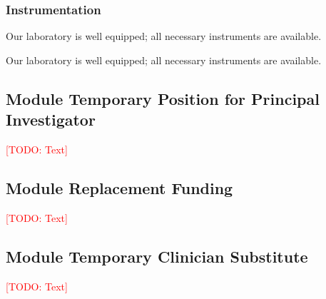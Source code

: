 \documentclass[american,firsttime]{dfgproposal}
\newcommand{\todo}[1]{\xspace{\textcolor{red}{[TODO: #1]}}\xspace}
\begin{document}
	\subsubsection{Instrumentation}
	
	Our laboratory is well equipped; all necessary instruments are available.
	
	Our laboratory is well equipped; all necessary instruments are available.
	
	
	
	\subsection{Module Temporary Position for Principal Investigator}
	\todo{Text}
	
	\subsection{Module Replacement Funding}
	\todo{Text}
	
	\subsection{Module Temporary Clinician Substitute}
	\todo{Text}
	
\end{document}

